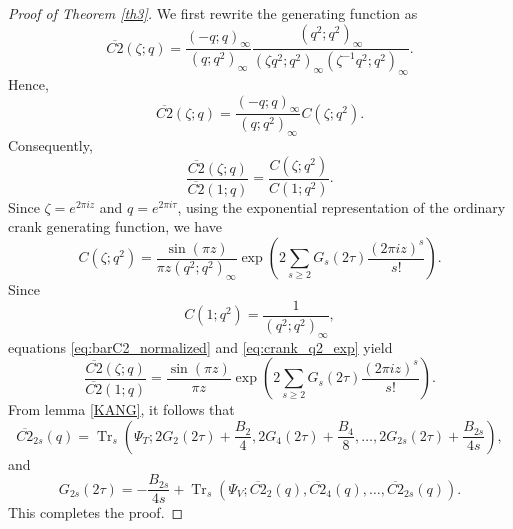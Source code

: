 \documentclass[12pt,oneside,reqno]{amsart}
\numberwithin{equation}{section}
\begin{document}
\begin{proof}[Proof of Theorem \ref{th3}]
	We first rewrite the generating function as
	\begin{equation}\label{ovr2.1}
		\overline{C2}(\zeta;q)
		=
		\frac{(-q;q)_{\infty}}{(q;q^2)_{\infty}}
		\frac{(q^2;q^2)_{\infty}}
		{(\zeta q^2;q^2)_{\infty}
			(\zeta^{-1}q^2;q^2)_{\infty}}.
	\end{equation}
	Hence,
	\begin{equation}\label{ovr2.2}
		\overline{C2}(\zeta;q)
		=
		\frac{(-q;q)_{\infty}}{(q;q^2)_{\infty}}
		C(\zeta;q^2).
	\end{equation}
	Consequently,
	\begin{equation}
		\frac{\overline{C2}(\zeta;q)}
		{\overline{C2}(1;q)}
		=
		\frac{C(\zeta;q^2)}
		{C(1;q^2)}.
		\label{eq:barC2_normalized}
	\end{equation}
	Since $\zeta=e^{2\pi iz}$ and $q=e^{2\pi i\tau}$, using the
	exponential representation of the ordinary crank generating function,
	we have
	\begin{equation}
		C(\zeta;q^2)
		=
		\frac{\sin(\pi z)}
		{\pi z(q^2;q^2)_{\infty}}
		\exp\left(
		2\sum_{s\geq2}
		G_s(2\tau)
		\frac{(2\pi iz)^s}{s!}
		\right).
		\label{eq:crank_q2_exp}
	\end{equation}
	Since
	\begin{equation}
		C(1;q^2)
		=
		\frac{1}{(q^2;q^2)_{\infty}},
	\end{equation}
	equations \eqref{eq:barC2_normalized} and
	\eqref{eq:crank_q2_exp} yield
	\begin{equation}
		\frac{\overline{C2}(\zeta;q)}
		{\overline{C2}(1;q)}
		=
		\frac{\sin(\pi z)}{\pi z}
		\exp\left(
		2\sum_{s\geq2}
		G_s(2\tau)
		\frac{(2\pi iz)^s}{s!}
		\right).
		\label{eq:barC2_exponential}
	\end{equation}
	 From lemma \eqref{KANG}, it follows that
	\begin{equation}
		\overline{C2}_{2s}(q)
		=
		\operatorname{Tr}_s
		\left(
		\Psi_T;
		2G_2(2\tau)+\frac{B_2}{4},
		2G_4(2\tau)+\frac{B_4}{8},
		\ldots,
		2G_{2s}(2\tau)+\frac{B_{2s}}{4s}
		\right),
		\label{eq:barC2_trace}
	\end{equation}
	and
	\begin{equation}
		G_{2s}(2\tau)
		=
		-\frac{B_{2s}}{4s}
		+
		\operatorname{Tr}_s
		\left(
		\Psi_V;
		\overline{C2}_{2}(q),
		\overline{C2}_{4}(q),
		\ldots,
		\overline{C2}_{2s}(q)
		\right).
		\label{eq:barC2_inverse}
	\end{equation}
	This completes the proof.
\end{proof}
	
\end{document}
